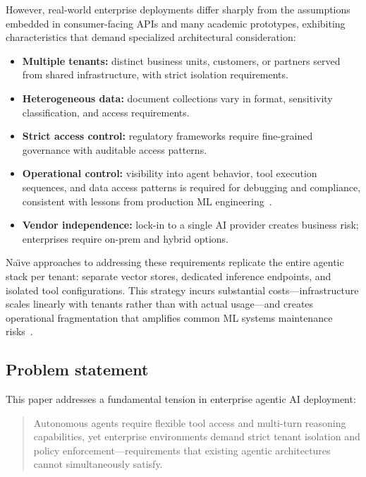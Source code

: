 \documentclass[sigconf]{acmart}
\begin{document}
However, real-world enterprise deployments differ sharply from the assumptions embedded in consumer-facing APIs and many academic prototypes, exhibiting characteristics that demand specialized architectural consideration:
\begin{itemize}
  \item \textbf{Multiple tenants:} distinct business units, customers, or partners served from shared infrastructure, with strict isolation requirements.
  \item \textbf{Heterogeneous data:} document collections vary in format, sensitivity classification, and access requirements.
  \item \textbf{Strict access control:} regulatory frameworks require fine-grained governance with auditable access patterns.
  \item \textbf{Operational control:} visibility into agent behavior, tool execution sequences, and data access patterns is required for debugging and compliance, consistent with lessons from production ML engineering~\cite{amershi2019se4ml}.
  \item \textbf{Vendor independence:} lock-in to a single AI provider creates business risk; enterprises require on-prem and hybrid options.
\end{itemize}

Na\"{\i}ve approaches to addressing these requirements replicate the entire agentic stack per tenant: separate vector stores, dedicated inference endpoints, and isolated tool configurations.
This strategy incurs substantial costs---infrastructure scales linearly with tenants rather than with actual usage---and creates operational fragmentation that amplifies common ML systems maintenance risks~\cite{sculley2015hiddentechnicaldebt}.

\subsection{Problem statement}
This paper addresses a fundamental tension in enterprise agentic AI deployment:

\begin{quote}
Autonomous agents require flexible tool access and multi-turn reasoning capabilities, yet enterprise environments demand strict tenant isolation and policy enforcement---requirements that existing agentic architectures cannot simultaneously satisfy.
\end{quote}
\end{document}
